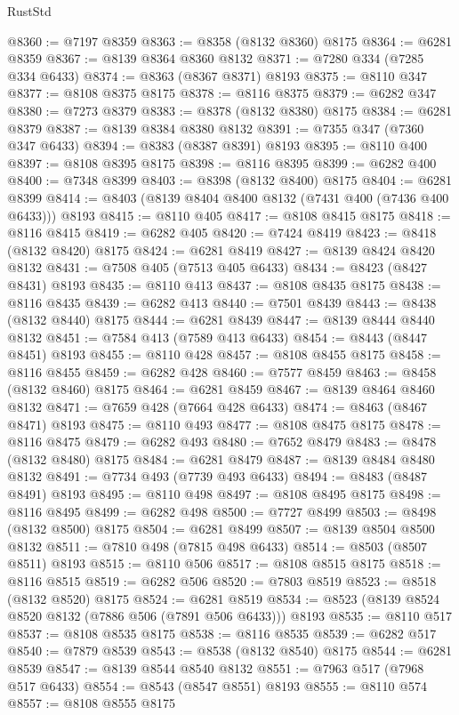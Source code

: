 \begin{lexlean}{RustStd}
\begin{coremodule}
@8360 := @7197 @8359
@8363 := @8358 (@8132 @8360) @8175
@8364 := @6281 @8359
@8367 := @8139 @8364 @8360 @8132
@8371 := @7280 @334 (@7285 @334 @6433)
@8374 := @8363 (@8367 @8371) @8193
@8375 := @8110 @347
@8377 := @8108 @8375 @8175
@8378 := @8116 @8375
@8379 := @6282 @347
@8380 := @7273 @8379
@8383 := @8378 (@8132 @8380) @8175
@8384 := @6281 @8379
@8387 := @8139 @8384 @8380 @8132
@8391 := @7355 @347 (@7360 @347 @6433)
@8394 := @8383 (@8387 @8391) @8193
@8395 := @8110 @400
@8397 := @8108 @8395 @8175
@8398 := @8116 @8395
@8399 := @6282 @400
@8400 := @7348 @8399
@8403 := @8398 (@8132 @8400) @8175
@8404 := @6281 @8399
@8414 := @8403 (@8139 @8404 @8400 @8132 (@7431 @400 (@7436 @400 @6433))) @8193
@8415 := @8110 @405
@8417 := @8108 @8415 @8175
@8418 := @8116 @8415
@8419 := @6282 @405
@8420 := @7424 @8419
@8423 := @8418 (@8132 @8420) @8175
@8424 := @6281 @8419
@8427 := @8139 @8424 @8420 @8132
@8431 := @7508 @405 (@7513 @405 @6433)
@8434 := @8423 (@8427 @8431) @8193
@8435 := @8110 @413
@8437 := @8108 @8435 @8175
@8438 := @8116 @8435
@8439 := @6282 @413
@8440 := @7501 @8439
@8443 := @8438 (@8132 @8440) @8175
@8444 := @6281 @8439
@8447 := @8139 @8444 @8440 @8132
@8451 := @7584 @413 (@7589 @413 @6433)
@8454 := @8443 (@8447 @8451) @8193
@8455 := @8110 @428
@8457 := @8108 @8455 @8175
@8458 := @8116 @8455
@8459 := @6282 @428
@8460 := @7577 @8459
@8463 := @8458 (@8132 @8460) @8175
@8464 := @6281 @8459
@8467 := @8139 @8464 @8460 @8132
@8471 := @7659 @428 (@7664 @428 @6433)
@8474 := @8463 (@8467 @8471) @8193
@8475 := @8110 @493
@8477 := @8108 @8475 @8175
@8478 := @8116 @8475
@8479 := @6282 @493
@8480 := @7652 @8479
@8483 := @8478 (@8132 @8480) @8175
@8484 := @6281 @8479
@8487 := @8139 @8484 @8480 @8132
@8491 := @7734 @493 (@7739 @493 @6433)
@8494 := @8483 (@8487 @8491) @8193
@8495 := @8110 @498
@8497 := @8108 @8495 @8175
@8498 := @8116 @8495
@8499 := @6282 @498
@8500 := @7727 @8499
@8503 := @8498 (@8132 @8500) @8175
@8504 := @6281 @8499
@8507 := @8139 @8504 @8500 @8132
@8511 := @7810 @498 (@7815 @498 @6433)
@8514 := @8503 (@8507 @8511) @8193
@8515 := @8110 @506
@8517 := @8108 @8515 @8175
@8518 := @8116 @8515
@8519 := @6282 @506
@8520 := @7803 @8519
@8523 := @8518 (@8132 @8520) @8175
@8524 := @6281 @8519
@8534 := @8523 (@8139 @8524 @8520 @8132 (@7886 @506 (@7891 @506 @6433))) @8193
@8535 := @8110 @517
@8537 := @8108 @8535 @8175
@8538 := @8116 @8535
@8539 := @6282 @517
@8540 := @7879 @8539
@8543 := @8538 (@8132 @8540) @8175
@8544 := @6281 @8539
@8547 := @8139 @8544 @8540 @8132
@8551 := @7963 @517 (@7968 @517 @6433)
@8554 := @8543 (@8547 @8551) @8193
@8555 := @8110 @574
@8557 := @8108 @8555 @8175

\end{coremodule}
\end{lexlean}
